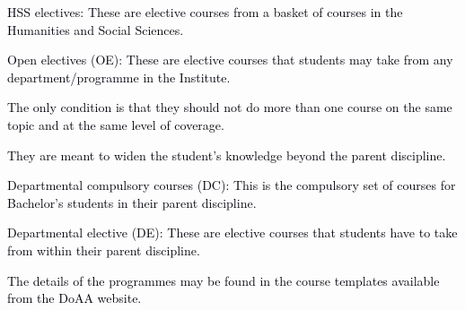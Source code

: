 \documentclass[12pt]{article}
\begin{document}
\vspace{\baselineskip}
{\fontsize{10pt}{12.0pt}\selectfont \textcolor[HTML]{00000A}{HSS electives: These are elective courses from a basket of courses in the Humanities and Social Sciences.}\par}\par


\vspace{\baselineskip}
{\fontsize{9pt}{10.8pt}\selectfont \textcolor[HTML]{00000A}{Open electives (OE): These are elective courses that students may take from any department/programme in the Institute.}\par}\par


\vspace{\baselineskip}
{\fontsize{9pt}{10.8pt}\selectfont \textcolor[HTML]{00000A}{The only condition is that they should not do more than one course on the same topic and at the same level of coverage.}\par}\par


\vspace{\baselineskip}
{\fontsize{10pt}{12.0pt}\selectfont \textcolor[HTML]{00000A}{They are meant to widen the student’s knowledge beyond the parent discipline.}\par}\par


\vspace{\baselineskip}
\begin{adjustwidth}{0.0in}{0.53in}
{\fontsize{10pt}{12.0pt}\selectfont \textcolor[HTML]{00000A}{Departmental compulsory courses (DC): This is the compulsory set of courses for Bachelor’s students in their parent discipline.}\par}\par

\end{adjustwidth}


\vspace{\baselineskip}
{\fontsize{9pt}{10.8pt}\selectfont \textcolor[HTML]{00000A}{Departmental elective (DE): These are elective courses that students have to take from within their parent discipline.}\par}\par


\vspace{\baselineskip}
{\fontsize{10pt}{12.0pt}\selectfont \textcolor[HTML]{00000A}{The details of the programmes may be found in the course templates available from the DoAA website.}\par}\par
\end{document}
